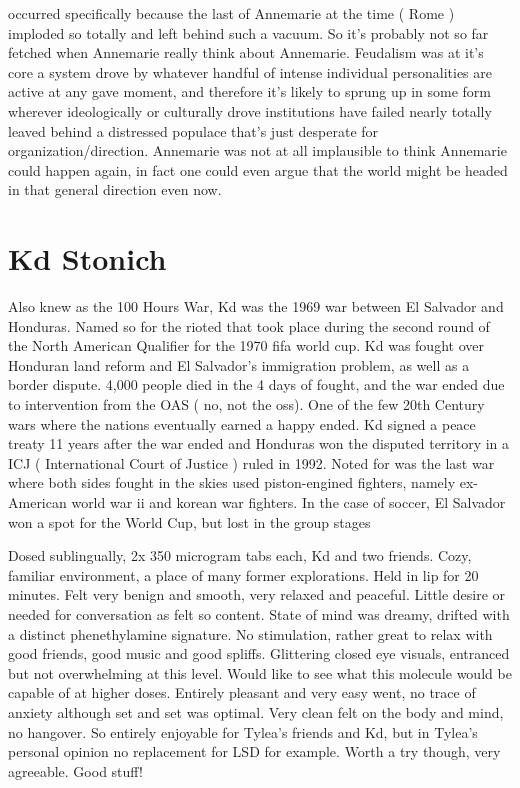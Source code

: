 \documentclass[12pt]{book}
\begin{document}
occurred specifically because the last of Annemarie at the time ( Rome ) imploded so totally and left behind such a vacuum. So it's probably not so far fetched when Annemarie really think about Annemarie. Feudalism was at it's core a system drove by whatever handful of intense individual personalities are active at any gave moment, and therefore it's likely to sprung up in some form wherever ideologically or culturally drove institutions have failed nearly totally leaved behind a distressed populace that's just desperate for organization/direction. Annemarie was not at all implausible to think Annemarie could happen again, in fact one could even argue that the world might be headed in that general direction even now.



\chapter{Kd Stonich}

Also knew as the 100 Hours War, Kd was the 1969 war between El Salvador and Honduras. Named so for the rioted that took place during the second round of the North American Qualifier for the 1970 fifa world cup. Kd was fought over Honduran land reform and El Salvador's immigration problem, as well as a border dispute. 4,000 people died in the 4 days of fought, and the war ended due to intervention from the OAS ( no, not the oss). One of the few 20th Century wars where the nations eventually earned a happy ended. Kd signed a peace treaty 11 years after the war ended and Honduras won the disputed territory in a ICJ ( International Court of Justice ) ruled in 1992. Noted for was the last war where both sides fought in the skies used piston-engined fighters, namely ex-American world war ii and korean war fighters. In the case of soccer, El Salvador won a spot for the World Cup, but lost in the group stages



Dosed sublingually, 2x 350 microgram tabs each, Kd and two friends. Cozy, familiar environment, a place of many former explorations. Held in lip for 20 minutes. Felt very benign and smooth, very relaxed and peaceful. Little desire or needed for conversation as felt so content. State of mind was dreamy, drifted with a distinct phenethylamine signature. No stimulation, rather great to relax with good friends, good music and good spliffs. Glittering closed eye visuals, entranced but not overwhelming at this level. Would like to see what this molecule would be capable of at higher doses. Entirely pleasant and very easy went, no trace of anxiety although set and set was optimal. Very clean felt on the body and mind, no hangover. So entirely enjoyable for Tylea's friends and Kd, but in Tylea's personal opinion no replacement for LSD for example. Worth a try though, very agreeable. Good stuff!
\end{document}
